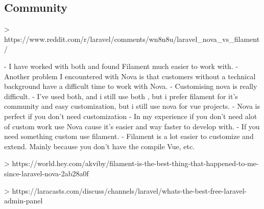 \subsection{Community}
> https://www.reddit.com/r/laravel/comments/wn8n8u/laravel_nova_vs_filament/

- I have worked with both and found Filament much easier to work with.
- Another problem I encountered with Nova is that customers without a technical background have a difficult time to work
with Nova.
- Customising nova is really difficult.
- I've used both, and i still use both , but i prefer filament for it's community and easy customization, but i still
use nova for vue projects.
- Nova is perfect if you don't need customization
- In my experience if you don’t need alot of custom work use Nova cause it’s easier and way faster to develop with.
- If you need something custom use filament.
- Filament is a lot easier to customize and extend. Mainly because you don’t have the compile Vue, etc.

> https://world.hey.com/akviby/filament-is-the-best-thing-that-happened-to-me-since-laravel-nova-2ab28a0f

> https://laracasts.com/discuss/channels/laravel/whats-the-best-free-laravel-admin-panel
